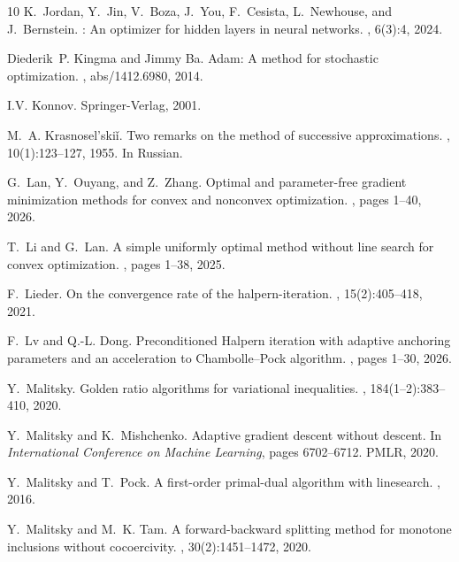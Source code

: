 \documentclass{article}
\theoremstyle{plain}
\theoremstyle{definition}
\newcommand{\0}{\boldsymbol{0}}
\begin{document}
\begin{thebibliography}{10}
K.~Jordan, Y.~Jin, V.~Boza, J.~You, F.~Cesista, L.~Newhouse, and J.~Bernstein.
: {A}n optimizer for hidden layers in neural networks.
, 6(3):4, 2024.

Diederik~P. Kingma and Jimmy Ba.
\newblock Adam: A method for stochastic optimization.
, abs/1412.6980, 2014.

I.V. Konnov.
\newblock Springer-Verlag, 2001.

M.~A. Krasnosel'ski\v{i}.
\newblock Two remarks on the method of successive approximations.
, 10(1):123--127, 1955.
\newblock In Russian.

G.~Lan, Y.~Ouyang, and Z.~Zhang.
\newblock Optimal and parameter-free gradient minimization methods for convex
  and nonconvex optimization.
, pages 1--40, 2026.

T.~Li and G.~Lan.
\newblock A simple uniformly optimal method without line search for convex
  optimization.
, pages 1--38, 2025.

F.~Lieder.
\newblock On the convergence rate of the halpern-iteration.
, 15(2):405--418, 2021.

F.~Lv and Q.-L. Dong.
\newblock Preconditioned {H}alpern iteration with adaptive anchoring parameters
  and an acceleration to {C}hambolle--{P}ock algorithm.
, pages 1--30, 2026.

Y.~Malitsky.
\newblock Golden ratio algorithms for variational inequalities.
, 184(1--2):383--410, 2020.

Y.~Malitsky and K.~Mishchenko.
\newblock Adaptive gradient descent without descent.
\newblock In {\em International Conference on Machine Learning}, pages
  6702--6712. PMLR, 2020.

Y.~Malitsky and T.~Pock.
\newblock A first-order primal-dual algorithm with linesearch.
, 2016.

Y.~Malitsky and M.~K. Tam.
\newblock A forward-backward splitting method for monotone inclusions without
  cocoercivity.
, 30(2):1451--1472, 2020.


\end{thebibliography}
\end{document}

